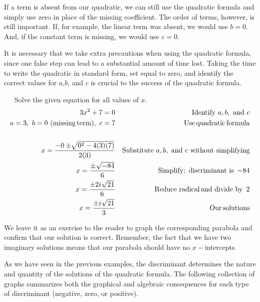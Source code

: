If a term is absent from our quadratic, we can still use the quadratic
formula and simply use zero in place of the missing coefficient. The order of terms, however, is still important.  If, for example, the
linear term was absent, we would use $b = 0$.  And, if the constant term is missing, we
would use $c=0$.\pp
\newpage

It is necessary that we take extra precautions when using the quadratic formula, since one false step can lead to a substantial amount of time lost.  Taking the time to write the quadratic in standard form, set equal to zero, and identify the correct values for $a$,$b$, and $c$ is crucial to the success of the quadratic formula.

\begin{example}~~~Solve the given equation for all values of $x$.
  \begin{eqnarray*}
    3 x^2 + 7 = 0 &  & \text{Identify~} a,b, \text{~and~}c\\
		a = 3,~ b = 0~ (\operatorname{missing} \operatorname{term}),~ c = 7 & & \operatorname{Use} \operatorname{quadratic} \operatorname{formula}\\
    & & \\
		x = \frac{- 0 \pm \sqrt[]{0^2 - 4 (3) (7)}}{2 (3)} &  & \text{Substitute~} a,b, \text{~and~} c \text{~without~simplifying}\\
    x = \frac{\pm~ \sqrt[]{- 84}}{6} &  & \operatorname{Simplify;~discriminant~is~}-84\\
    x = \frac{\pm 2 i~ \sqrt[]{21}}{6} &  & \operatorname{Reduce~radical} \operatorname{and~divide~by~}2\\
    x = \frac{\pm i~ \sqrt[]{21}}{3} &  & \operatorname{Our} \operatorname{solutions}
  \end{eqnarray*}
\end{example}
We leave it as an exercise to the reader to graph the corresponding parabola and confirm that our solution is correct.  Remember, the fact that we have two imaginary solutions means that our parabola should have no $x-$intercepts.\pp

\newpage

As we have seen in the previous examples, the discriminant determines the nature and quantity of the solutions of the quadratic formula.  The following collection of graphs summarizes both the graphical and algebraic consequences for each type of discriminant (negative, zero, or positive).\pp %

